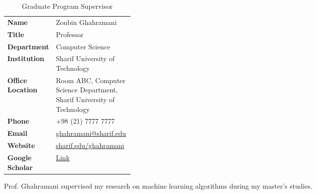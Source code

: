 \begin{table}[ht]
  \centering
  \begin{threeparttable}
    \renewcommand{\arraystretch}{1.5}
    \caption{Graduate Program Supervisor}
    \label{tbl:institution-2-masters-supervisor}
    \fontsize{9.5}{12}\selectfont
    \begin{tabularx}{0.65\textwidth}{
      >{\raggedright\arraybackslash}p{0.3\linewidth}
      >{\raggedright\arraybackslash}X
    }
    \toprule
    \cellcolor{myLightBlue}\textbf{Name} & Zoubin Ghahramani \\ 
    \cellcolor{myLightBlue}\textbf{Title} & Professor \\ 
    \cellcolor{myLightBlue}\textbf{Department} & Computer Science \\ 
    \cellcolor{myLightBlue}\textbf{Institution} & Sharif University of Technology \\ 
    \cellcolor{myLightBlue}\textbf{Office Location} & Room ABC, Computer Science Department, Sharif University of Technology \\ 
    \cellcolor{myLightBlue}\textbf{Phone} & +98 (21) 7777 7777 \\ 
    \cellcolor{myLightBlue}\textbf{Email} & \href{mailto:ghahramani@sharif.edu}{ghahramani@sharif.edu} \\ 
    \cellcolor{myLightBlue}\textbf{Website} & \href{https://sharif.edu/}{sharif.edu/\raisebox{0.5ex}{\texttildelow}ghahramani} \\ 
    
    \cellcolor{myLightBlue}\textbf{Google Scholar} & \href{https://scholar.google.com/}{Link} \\ \bottomrule
    \end{tabularx}
    \begin{tablenotes}
      \footnotesize
      \vspace{0.15cm}
      \item Prof. Ghahramani supervised my research on machine learning algorithms during my master’s studies.
    \end{tablenotes}
  \end{threeparttable}
  \vspace{0.5cm}
\end{table}

\clearpage

